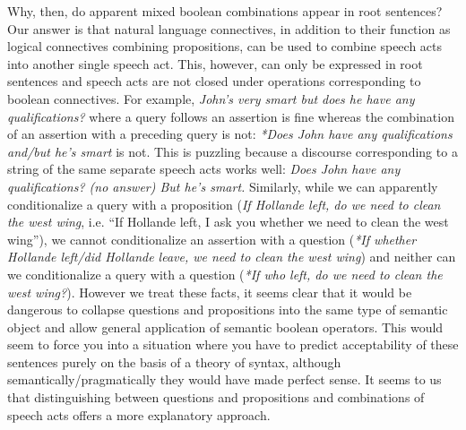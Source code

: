 \documentclass[12pt]{article}
\begin{document}
Why, then, do apparent mixed boolean combinations appear in root
sentences?  Our answer
is that natural language connectives, in addition to their
function as logical connectives combining propositions, can be used to
combine speech acts into another single speech act.  This, however, can only be expressed in root sentences and speech acts are not closed under operations
corresponding to boolean connectives.  For
example, \textit{John's very smart but does he have any
  qualifications?} where a query follows an assertion is fine whereas
the combination of an assertion with a preceding query is not:
\textit{*Does John have any qualifications and/but he's smart} is not.
This is puzzling because a discourse corresponding to a string of the
same separate speech acts works well:  \textit{Does John have any
  qualifications? (no answer) But he's smart.}  Similarly, while we
can apparently conditionalize a query with a proposition
(\textit{If Hollande left, do we need to clean the west wing},
i.e. ``If Hollande left, I ask you whether we need to clean the west
wing''), we cannot conditionalize an assertion with a question
(\textit{*If whether Hollande left/did Hollande leave, we need to
  clean the west wing}) and neither can we conditionalize a query
with a question (\textit{*If who left, do we need to clean the west
  wing?}).  However we treat these facts, it seems
clear that it would be dangerous to collapse questions and
propositions into the same type of semantic object and allow general
application of semantic boolean operators.  This would seem to force
you into a situation where you have to predict acceptability of these
sentences purely on the basis of a theory of syntax, although
semantically/pragmatically they would have made perfect sense.  It
seems to us that distinguishing between questions and propositions and
combinations of speech acts offers a more explanatory approach.
\end{document}
